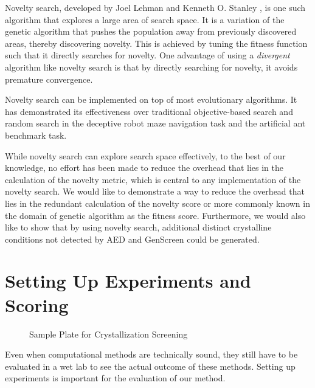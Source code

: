 Novelty search, developed by Joel Lehman and Kenneth O. Stanley \cite{Novelty}, is one such algorithm that explores a large area of search space. It is a variation of the genetic algorithm that pushes the population away from previously discovered areas, thereby discovering novelty. This is achieved by tuning the fitness function such that it directly searches for novelty. One advantage of using a \textit{divergent} algorithm like novelty search is that by directly searching for novelty, it avoids premature convergence\cite{novelty_premature_convergence}.

Novelty search can be implemented on top of most evolutionary algorithms\cite{Novelty}. It has demonstrated its effectiveness over traditional objective-based search and random search\cite{novelty_premature_convergence} in the deceptive robot maze navigation task\cite{Mouret2011} and the artificial ant benchmark task\cite{Koza_1992}.

While novelty search can explore search space effectively, to the best of our knowledge, no effort has been made to reduce the overhead that lies in the calculation of the novelty metric, which is central to any implementation of the novelty search.
We would like to demonstrate a way to reduce the overhead that lies in the redundant calculation of the novelty score or more commonly known in the domain of genetic algorithm as the fitness score.
Furthermore, we would also like to show that by using novelty search, additional distinct crystalline conditions not detected by AED and GenScreen could be generated. %


\section{Setting Up Experiments and Scoring} \label{sec:bg-setting}

\begin{figure}[H]
	\caption{Sample Plate for Crystallization Screening}
	\label{fig:plate}
\end{figure}

Even when computational methods are technically sound, they still have to be evaluated in a wet lab to see the actual outcome of these methods. Setting up experiments is important for the evaluation of our method.

